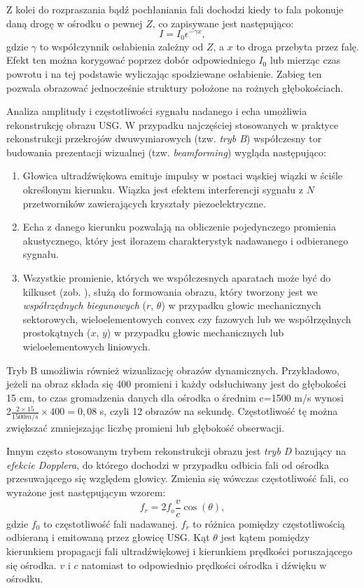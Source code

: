 Z kolei do rozpraszania bądź pochłaniania fali dochodzi kiedy to fala pokonuje daną drogę w ośrodku o pewnej $Z$, co zapisywane jest następująco:
\begin{equation}
I=I_0 \epsilon^{-\gamma x},
\end{equation}
gdzie $\gamma$ to współczynnik osłabienia zależny od $Z$, a $x$ to droga przebyta przez falę. Efekt ten można korygować poprzez dobór odpowiedniego $I_0$ lub mierząc czas powrotu i na tej podstawie wyliczając spodziewane osłabienie. Zabieg ten pozwala obrazować jednocześnie struktury położone na rożnych głębokościach.

Analiza amplitudy i częstotliwości sygnału nadanego i echa umożliwia rekonstrukcję obrazu USG. W przypadku najczęściej stosowanych w praktyce rekonstrukcji przekrojów dwuwymiarowych (tzw. \textit{tryb B}) współczesny tor budowania prezentacji wizualnej (tzw. \textit{beamforming}) wygląda następująco: 
\begin{enumerate}
	\item Głowica ultradźwiękowa emituje impulsy w postaci wąskiej wiązki w ściśle określonym kierunku. Wiązka jest efektem interferencji sygnału z $N$ przetworników zawierających kryształy piezoelektryczne.
	\item Echa z danego kierunku pozwalają na obliczenie pojedynczego promienia akustycznego, który jest ilorazem charakterystyk nadawanego i odbieranego sygnału.
	\item Wszystkie promienie, których we współczesnych aparatach może być do kilkuset (zob. \cite{GEVoluson}), służą do formowania obrazu, który tworzony jest we \textit{współrzędnych biegunowych} ($r$, $\theta$) w przypadku głowic mechanicznych sektorowych, wieloelementowych convex czy fazowych lub we współrzędnych prostokątnych ($x$, $y$) w przypadku głowic mechanicznych lub wieloelementowych liniowych. 
\end{enumerate}

Tryb B umożliwia również wizualizację obrazów dynamicznych. Przykładowo, jeżeli na obraz składa się 400 promieni i każdy odsłuchiwany jest do głębokości 15 cm, to czas gromadzenia danych dla ośrodka o średnim c=1500 m/s wynosi $2\frac{2\times15}{1500 m/s}\times400 = 0,08$ s, czyli 12 obrazów na sekundę. Częstotliwość tę można zwiększać zmniejszając liczbę promieni lub głębokość obserwacji.

Innym często stosowanym trybem rekonstrukcji obrazu jest \textit{tryb D} bazujący \linebreak na \textit{efekcie Dopplera}, do którego dochodzi w przypadku odbicia fali od ośrodka przesuwającego się względem głowicy. Zmienia się wówczas częstotliwość fali, co wyrażone jest następującym wzorem:
\begin{equation}
f_r = 2 f_o\frac{v}{c}\cos(\theta),
\end{equation} 
gdzie $f_0$ to częstotliwość fali nadawanej.  $f_r$ to różnica pomiędzy częstotliwością odbieraną i emitowaną przez głowicę USG. Kąt $\theta$ jest kątem pomiędzy kierunkiem propagacji fali ultradźwiękowej i kierunkiem prędkości poruszającego się ośrodka. $v$ i $c$ natomiast to odpowiednio prędkości ośrodka i dźwięku w ośrodku.

